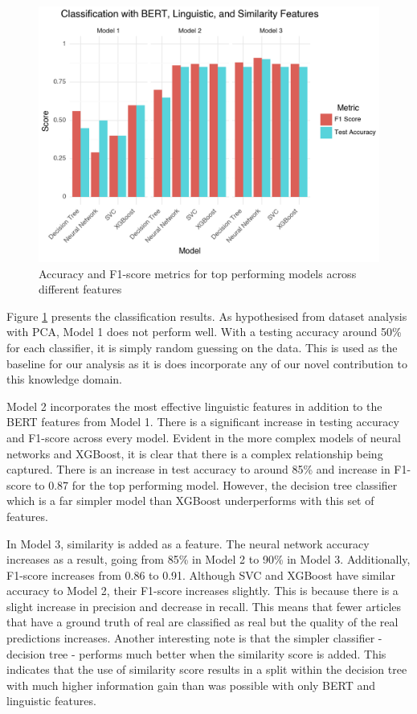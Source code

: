 \documentclass{article}
\begin{document}
\begin{figure}[]
  \centering
  \includegraphics[scale=0.8]{img/accuracy_combined_graph.png}
  \caption{Accuracy and F1-score metrics for top performing models across different features}
  \label{accuracy_graph}
\end{figure}

Figure \ref{accuracy_graph} presents the classification results. As hypothesised from dataset analysis with PCA, Model 1 does not perform well. With a testing accuracy around 50\% for each classifier, it is simply random guessing on the data. This is used as the baseline for our analysis as it is does incorporate any of our novel contribution to this knowledge domain.

Model 2 incorporates the most effective linguistic features in addition to the BERT features from Model 1. There is a significant increase in testing accuracy and F1-score across every model. Evident in the more complex models of neural networks and XGBoost, it is clear that there is a complex relationship being captured. There is an increase in test accuracy to around 85\% and increase in F1-score to 0.87 for the top performing model. However, the decision tree classifier which is a far simpler model than XGBoost underperforms with this set of features.

In Model 3, similarity is added as a feature. The neural network accuracy increases as a result, going from 85\% in Model 2 to 90\% in Model 3. Additionally, F1-score increases from 0.86 to 0.91. Although SVC and XGBoost have similar accuracy to Model 2, their F1-score increases slightly. This is because there is a slight increase in precision and decrease in recall. This means that fewer articles that have a ground truth of real are classified as real but the quality of the real predictions increases. Another interesting note is that the simpler classifier - decision tree - performs much better when the similarity score is added. This indicates that the use of similarity score results in a split within the decision tree with much higher information gain than was possible with only BERT and linguistic features.
\end{document}

